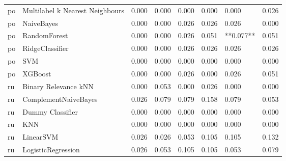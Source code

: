 \begin{tabular}{llllllll}
      po & Multilabel k Nearest Neighbours &     0.000 &                     0.000 &                 0.000 &                  0.000 &                                   0.000 &     0.026 \\
      po &                      NaiveBayes &     0.000 &                     0.000 &                 0.026 &                  0.026 &                                   0.026 &     0.000 \\
      po &                    RandomForest &     0.000 &                     0.000 &                 0.026 &                  0.051 &                               **0.077** &     0.051 \\
      po &                 RidgeClassifier &     0.000 &                     0.000 &                 0.026 &                  0.026 &                                   0.026 &     0.026 \\
      po &                             SVM &     0.000 &                     0.000 &                 0.000 &                  0.000 &                                   0.000 &     0.000 \\
      po &                         XGBoost &     0.000 &                     0.000 &                 0.026 &                  0.000 &                                   0.026 &     0.051 \\
      ru &            Binary Relevance kNN &     0.000 &                     0.053 &                 0.000 &                  0.026 &                                   0.000 &     0.000 \\
      ru &            ComplementNaiveBayes &     0.026 &                     0.079 &                 0.079 &                  0.158 &                                   0.079 &     0.053 \\
      ru &                Dummy Classifier &     0.000 &                     0.000 &                 0.000 &                  0.000 &                                   0.000 &     0.000 \\
      ru &                             KNN &     0.000 &                     0.000 &                 0.000 &                  0.000 &                                   0.000 &     0.000 \\
      ru &                       LinearSVM &     0.026 &                     0.026 &                 0.053 &                  0.105 &                                   0.105 &     0.132 \\
      ru &              LogisticRegression &     0.026 &                     0.053 &                 0.105 &                  0.105 &                                   0.053 &     0.079 \\

\end{tabular}
